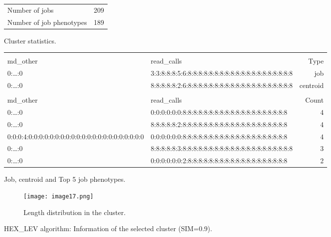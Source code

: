 \documentclass{jhps}
\begin{document}
\begin{cluster}
	\begin{subtable}{\textwidth}
		\centering
		\begin{tabular}{ll}
			Number of jobs & 209 \\
			Number of job phenotypes & 189 \\
		\end{tabular}
		\caption{Cluster statistics.}
		\label{cluster:use_case:hex_lev:stats}
	\end{subtable}
	\medskip
	\begin{subtable}{\textwidth}
		\centering
		\begin{tiny}
			\begin{tabular}{ll|r}
				\rowcolor{tblhead}
				\multicolumn{2}{l|}{Hexadecimal coding} & \\
				\rowcolor{tblhead}
				md\_other                                           &  read\_calls                                           & Type     \\ 
				\hline
				0:\dots:0                                           &  3:3:8:8:8:5:6:8:8:8:8:8:8:8:8:8:8:8:8:8:8:8:8:8:8:8:8 & job      \\ 
				0:\dots:0                                           &  8:8:8:8:8:2:6:8:8:8:8:8:8:8:8:8:8:8:8:8:8:8:8:8:8:8:8 & centroid \\ 
				\multicolumn{3}{l}{}                                \\ 
				\rowcolor{tblhead}      md\_other                   &  read\_calls                                           & Count    \\ 
				\hline
				0:\dots:0                                           &  0:0:0:0:0:0:8:8:8:8:8:8:8:8:8:8:8:8:8:8:8:8:8:8:8:8   & 4        \\ 
				0:\dots:0                                           &  8:8:8:8:8:2:8:8:8:8:8:8:8:8:8:8:8:8:8:8:8:8:8:8:8:8   & 4        \\ 
				0:0:0:4:0:0:0:0:0:0:0:0:0:0:0:0:0:0:0:0:0:0:0:0:0:0 &  0:0:0:0:0:0:8:8:8:8:8:8:8:8:8:8:8:8:8:8:8:8:8:8:8:8   & 4        \\ 
				0:\dots:0                                           &  8:8:8:8:8:3:8:8:8:8:8:8:8:8:8:8:8:8:8:8:8:8:8:8:8:8:8 & 3        \\ 
				0:\dots:0                                           &  0:0:0:0:0:0:2:8:8:8:8:8:8:8:8:8:8:8:8:8:8:8:8:8:8:8   & 2        \\ 
			\end{tabular}
		\end{tiny}
		\caption{Job, centroid and Top 5 job phenotypes.}
		\label{cluster:use_case:hex_lev:top_jobs}
	\end{subtable}
	\medskip
	\begin{subfigure}{\textwidth}
		\centering
		\texttt{[image: image17.png]}
		\caption{Length distribution in the cluster.}
		\label{cluster:use_case:hex_lev:length}
	\end{subfigure}
	\caption{HEX\_LEV algorithm: Information of the selected cluster (SIM=0.9).}
	\label{cluster:use_case:hex_lev}
\end{cluster}
\end{document}

